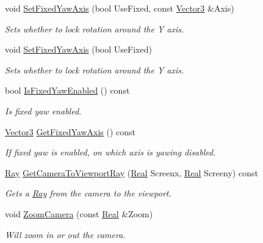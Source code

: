 \begin{DoxyCompactItemize}
void \hyperlink{classphys_1_1Camera_aa6d7285b7a3fc43e3c6dd05ff30f89ab}{SetFixedYawAxis} (bool UseFixed, const \hyperlink{classphys_1_1Vector3}{Vector3} \&Axis)
\begin{DoxyCompactList}\small\item\em Sets whether to lock rotation around the Y axis. \item\end{DoxyCompactList}\item 
void \hyperlink{classphys_1_1Camera_a1b4d5be85c528541c7a1cbebb41bfd89}{SetFixedYawAxis} (bool UseFixed)
\begin{DoxyCompactList}\small\item\em Sets whether to lock rotation around the Y axis. \item\end{DoxyCompactList}\item 
bool \hyperlink{classphys_1_1Camera_a9b0aa17df46c427ab531bd587bd76e0f}{IsFixedYawEnabled} () const 
\begin{DoxyCompactList}\small\item\em Is fixed yaw enabled. \item\end{DoxyCompactList}\item 
\hyperlink{classphys_1_1Vector3}{Vector3} \hyperlink{classphys_1_1Camera_a1f4126761e14d9b960395c79b6c4f13f}{GetFixedYawAxis} () const 
\begin{DoxyCompactList}\small\item\em If fixed yaw is enabled, on which axis is yawing disabled. \item\end{DoxyCompactList}\item 
\hyperlink{classphys_1_1Ray}{Ray} \hyperlink{classphys_1_1Camera_a01d119eb8bd10a8654493b043110ca0f}{GetCameraToViewportRay} (\hyperlink{namespacephys_af7eb897198d265b8e868f45240230d5f}{Real} Screenx, \hyperlink{namespacephys_af7eb897198d265b8e868f45240230d5f}{Real} Screeny) const 
\begin{DoxyCompactList}\small\item\em Gets a \hyperlink{classphys_1_1Ray}{Ray} from the camera to the viewport. \item\end{DoxyCompactList}\item 
void \hyperlink{classphys_1_1Camera_a66e2854557687d98cc5882363e6d6606}{ZoomCamera} (const \hyperlink{namespacephys_af7eb897198d265b8e868f45240230d5f}{Real} \&Zoom)
\begin{DoxyCompactList}\small\item\em Will zoom in or out the camera. \item\end{DoxyCompactList}\item 

\end{DoxyCompactItemize}
